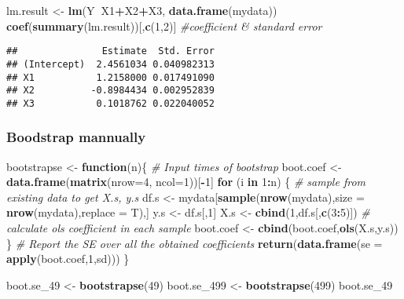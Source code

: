\documentclass[]{article}
\newenvironment{Shaded}{\begin{snugshade}}{\end{snugshade}}
\newcommand{\KeywordTok}[1]{\textcolor[rgb]{0.13,0.29,0.53}{\textbf{#1}}}
\newcommand{\DataTypeTok}[1]{\textcolor[rgb]{0.13,0.29,0.53}{#1}}
\newcommand{\DecValTok}[1]{\textcolor[rgb]{0.00,0.00,0.81}{#1}}
\newcommand{\StringTok}[1]{\textcolor[rgb]{0.31,0.60,0.02}{#1}}
\newcommand{\CommentTok}[1]{\textcolor[rgb]{0.56,0.35,0.01}{\textit{#1}}}
\newcommand{\ControlFlowTok}[1]{\textcolor[rgb]{0.13,0.29,0.53}{\textbf{#1}}}
\newcommand{\OperatorTok}[1]{\textcolor[rgb]{0.81,0.36,0.00}{\textbf{#1}}}
\newcommand{\NormalTok}[1]{#1}
\begin{document}
\begin{Shaded}
\begin{Highlighting}[]
\NormalTok{lm.result <-}\StringTok{ }\KeywordTok{lm}\NormalTok{(Y}\OperatorTok{~}\NormalTok{X1}\OperatorTok{+}\NormalTok{X2}\OperatorTok{+}\NormalTok{X3, }\KeywordTok{data.frame}\NormalTok{(mydata))}
\KeywordTok{coef}\NormalTok{(}\KeywordTok{summary}\NormalTok{(lm.result))[,}\KeywordTok{c}\NormalTok{(}\DecValTok{1}\NormalTok{,}\DecValTok{2}\NormalTok{)] }\CommentTok{#coefficient & standard error}
\end{Highlighting}
\end{Shaded}

\begin{verbatim}
##               Estimate  Std. Error
## (Intercept)  2.4561034 0.040982313
## X1           1.2158000 0.017491090
## X2          -0.8984434 0.002952839
## X3           0.1018762 0.022040052
\end{verbatim}

\subsubsection{Boodstrap mannually}\label{boodstrap-mannually}

\begin{Shaded}
\begin{Highlighting}[]
\NormalTok{bootstrapse <-}\StringTok{ }\ControlFlowTok{function}\NormalTok{(n)\{}
  \CommentTok{# Input times of bootstrap}
\NormalTok{  boot.coef <-}\StringTok{ }\KeywordTok{data.frame}\NormalTok{(}\KeywordTok{matrix}\NormalTok{(}\DataTypeTok{nrow=}\DecValTok{4}\NormalTok{, }\DataTypeTok{ncol=}\DecValTok{1}\NormalTok{))[}\OperatorTok{-}\DecValTok{1}\NormalTok{]}
  \ControlFlowTok{for}\NormalTok{ (i }\ControlFlowTok{in} \DecValTok{1}\OperatorTok{:}\NormalTok{n) \{}
    \CommentTok{# sample from existing data to get X.s, y.s}
\NormalTok{    df.s <-}\StringTok{ }\NormalTok{mydata[}\KeywordTok{sample}\NormalTok{(}\KeywordTok{nrow}\NormalTok{(mydata),}\DataTypeTok{size =} \KeywordTok{nrow}\NormalTok{(mydata),}\DataTypeTok{replace =}\NormalTok{ T),]}
\NormalTok{    y.s <-}\StringTok{ }\NormalTok{df.s[,}\DecValTok{1}\NormalTok{]}
\NormalTok{    X.s <-}\StringTok{ }\KeywordTok{cbind}\NormalTok{(}\DecValTok{1}\NormalTok{,df.s[,}\KeywordTok{c}\NormalTok{(}\DecValTok{3}\OperatorTok{:}\DecValTok{5}\NormalTok{)])}
    \CommentTok{# calculate ols coefficient in each sample}
\NormalTok{    boot.coef <-}\StringTok{ }\KeywordTok{cbind}\NormalTok{(boot.coef,}\KeywordTok{ols}\NormalTok{(X.s,y.s))}
\NormalTok{  \}}
  \CommentTok{# Report the SE over all the obtained coefficients}
  \KeywordTok{return}\NormalTok{(}\KeywordTok{data.frame}\NormalTok{(}\DataTypeTok{se =} \KeywordTok{apply}\NormalTok{(boot.coef,}\DecValTok{1}\NormalTok{,sd)))}
\NormalTok{\}}

\NormalTok{boot.se_}\DecValTok{49}\NormalTok{ <-}\StringTok{ }\KeywordTok{bootstrapse}\NormalTok{(}\DecValTok{49}\NormalTok{)}
\NormalTok{boot.se_}\DecValTok{499}\NormalTok{ <-}\StringTok{ }\KeywordTok{bootstrapse}\NormalTok{(}\DecValTok{499}\NormalTok{)}
\NormalTok{boot.se_}\DecValTok{49}
\end{Highlighting}
\end{Shaded}
\end{document}
